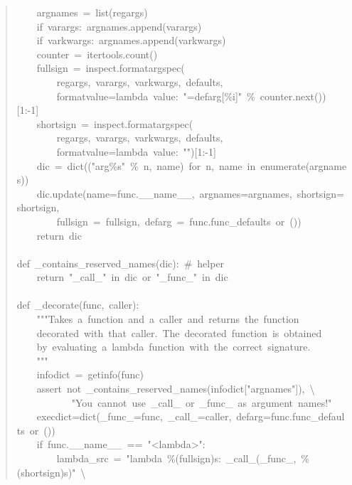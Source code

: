 \documentclass[10pt,a4paper,english]{article}
\begin{document}
\begin{quote}
{~~~~argnames~=~list(regargs)~\\
~~~~if~varargs:~argnames.append(varargs)~\\
~~~~if~varkwargs:~argnames.append(varkwargs)~\\
~~~~counter~=~itertools.count()~\\
~~~~fullsign~=~inspect.formatargspec(~\\
~~~~~~~~regargs,~varargs,~varkwargs,~defaults,~\\
~~~~~~~~formatvalue=lambda~value:~"=defarg{[}{\%}i]"~{\%}~counter.next()){[}1:-1]~\\
~~~~shortsign~=~inspect.formatargspec(~\\
~~~~~~~~regargs,~varargs,~varkwargs,~defaults,~\\
~~~~~~~~formatvalue=lambda~value:~"{}"){[}1:-1]~\\
~~~~dic~=~dict(("arg{\%}s"~{\%}~n,~name)~for~n,~name~in~enumerate(argnames))~\\
~~~~dic.update(name=func.{\_}{\_}name{\_}{\_},~argnames=argnames,~shortsign=shortsign,~\\
~~~~~~~~fullsign~=~fullsign,~defarg~=~func.func{\_}defaults~or~())~\\
~~~~return~dic~\\
~\\
def~{\_}contains{\_}reserved{\_}names(dic):~{\#}~helper~\\
~~~~return~"{\_}call{\_}"~in~dic~or~"{\_}func{\_}"~in~dic~\\
~\\
def~{\_}decorate(func,~caller):~\\
~~~~"{}"{}"Takes~a~function~and~a~caller~and~returns~the~function~\\
~~~~decorated~with~that~caller.~The~decorated~function~is~obtained~\\
~~~~by~evaluating~a~lambda~function~with~the~correct~signature.~\\
~~~~"{}"{}"~\\
~~~~infodict~=~getinfo(func)~\\
~~~~assert~not~{\_}contains{\_}reserved{\_}names(infodict{[}"argnames"]),~{\textbackslash}~\\
~~~~~~~~~~~"You~cannot~use~{\_}call{\_}~or~{\_}func{\_}~as~argument~names!"~\\
~~~~execdict=dict({\_}func{\_}=func,~{\_}call{\_}=caller,~defarg=func.func{\_}defaults~or~())~\\
~~~~if~func.{\_}{\_}name{\_}{\_}~==~"<lambda>":~\\
~~~~~~~~lambda{\_}src~=~"lambda~{\%}(fullsign)s:~{\_}call{\_}({\_}func{\_},~{\%}(shortsign)s)"~{\textbackslash}~\\
}
\end{quote}
\end{document}
